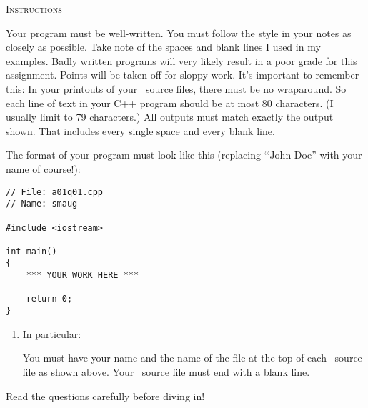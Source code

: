 
\textsc{Instructions}
\begin{enumerate}
\li Your program must be well-written. 
    You must follow the style in your notes as closely as possible. 
    Take note of the spaces and blank lines I used in my examples. 
    Badly written programs will very likely result in a poor grade for this 
    assignment. 
    Points will be taken off for sloppy work. 
\li It's important to remember this: In your printouts of your \cpp\ source
files, 
    there must be no wraparound. So each line of text in your C++ program
    should be at most 80 characters. (I usually limit to 79 characters.)
\li All outputs must match exactly the output shown. 
    That includes every single space and every blank line.

\li The format of your program must look like this
(replacing \lq\lq John Doe'' with your name of course!):
\end{enumerate}
\begin{Verbatim}[frame=single]
// File: a01q01.cpp
// Name: smaug

#include <iostream>

int main()
{
    *** YOUR WORK HERE ***

    return 0;
}
\end{Verbatim}

\begin{enumerate}
\item[] In particular:
\begin{enumerate}
\li You must have your name and the name of the file at the top of each 
    \cpp\ source file as shown above.
\li Your \cpp\ source file must end with a blank line.
\end{enumerate}

\end{enumerate}

Read the questions carefully before diving in!
